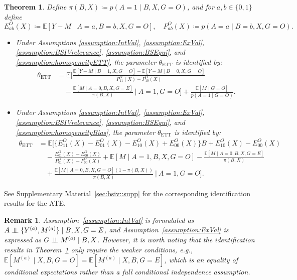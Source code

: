 \documentclass[10pt]{article}
\newtheorem{theorem}{Theorem}
\newtheorem{remark}{Remark}
\newcommand{\E}{\mathbb{E}}
\newcommand{\independent}{\perp\mkern-9.5mu\perp}
\begin{document}
\begin{theorem}
\label{thm:BSIV_ett}
Define $\pi(B,X) \coloneqq p(A=1 \mid B,X,G=O)$, and for $a,b \in \{0,1\}$ define 
\[
E_{ab}^O(X) \coloneqq \E[Y - M \mid A=a, B=b, X, G=O], \quad
P_{ab}^O(X) \coloneqq p(A=a \mid B=b, X, G=O).
\]	

\begin{itemize}
\item[(a)] 
Under Assumptions \ref{assumption:IntVal}, \ref{assumption:ExVal}, \ref{assumption:BSIVrelevance}, \ref{assumption:BSEqui}, and \ref{assumption:homogeneityETT}, the parameter $\theta_{\text{ETT}}$ is identified by:
{\small
\begin{equation}
\label{eq:param2}
\begin{aligned}
\theta_{\text{ETT}}
&= \E\Bigg[
\frac{\E[Y - M \mid B=1, X, G=O] - \E[Y - M \mid B=0, X, G=O]}{P_{11}^O(X) - P_{10}^O(X)} \\
&\quad - \frac{\E[M \mid A=0, B, X, G=E]}{\pi(B, X)}
\ \Big| \ A=1, G=O
\Bigg]
+ \frac{\E[M \mid G=O]}{p(A=1 \mid G=O)}.
\end{aligned}
\end{equation}
}
\item[(b)]
Under Assumptions \ref{assumption:IntVal}, \ref{assumption:ExVal}, \ref{assumption:BSIVrelevance}, \ref{assumption:BSEqui}, and \ref{assumption:homogeneityBias}, the parameter $\theta_{\text{ETT}}$ is identified by:
{\small
\begin{equation}
\label{eq:param3}
\begin{aligned}
\theta_{\text{ETT}} 
&= \E\Bigg[
\big\{ E_{11}^O(X) - E_{01}^O(X) - E_{10}^O(X) + E_{00}^O(X) \big\} B + E_{10}^O(X) - E_{00}^O(X) \\
&\quad - \frac{E_{01}^O(X) \!-\! E_{00}^O(X)}{P_{01}^O(X) \!-\! P_{00}^O(X)}
\!+\! \E[M \!\mid \!A=1, B, X, G=O] 
\!-\! \frac{\E[M \!\mid \!A=0, B, X, G=E]}{\pi(B, X)} \\
&\quad + \frac{\E[M \mid A=0, B, X, G=O](1 - \pi(B, X))}{\pi(B, X)}
\ \Big| \ A=1, G=O
\Bigg].
\end{aligned}
\end{equation}
}
\end{itemize}
\end{theorem}
See Supplementary Material~\ref{sec:bsiv::supp} for the corresponding identification results for the ATE.
\begin{remark}
\label{rmk:real_ex_val}
Assumption~\ref{assumption:IntVal} is formulated as $A \independent \{Y^{(a)}, M^{(a)}\} \mid B, X, G=E$, and  Assumption~\ref{assumption:ExVal} is expressed as $G \independent M^{(a)} \mid B, X$. However, it is worth noting that the identification results in Theorem~\ref{thm:BSIV_ett} only require the weaker conditions, e.g., $\E[M^{(a)} \mid X, B, G=O] = \E[M^{(a)} \mid X, B, G=E]$, which is an equality of conditional expectations rather than a full conditional independence assumption.
\end{remark}
\end{document}
